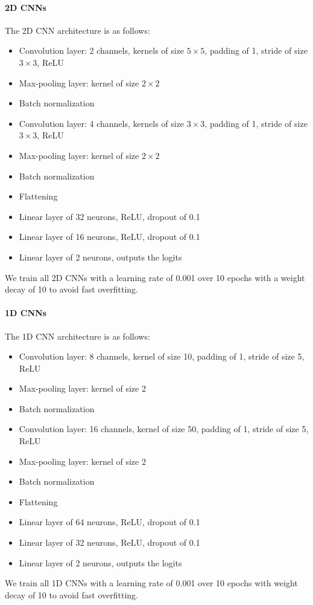 \documentclass[10pt,conference,compsocconf]{IEEEtran}
\begin{document}
\paragraph{2D CNNs}
The 2D CNN architecture is as follows:
\begin{itemize}
  \item Convolution layer: 2 channels, kernels of size \(5\times 5\), padding of 1, stride of size \(3\times 3\), ReLU
  \item Max-pooling layer: kernel of size \(2\times 2\)
  \item Batch normalization
  \item Convolution layer: 4 channels, kernels of size \(3\times 3\), padding of 1, stride of size \(3\times 3\), ReLU
  \item Max-pooling layer: kernel of size \(2\times 2\)
  \item Batch normalization
  \item Flattening
  \item Linear layer of 32 neurons, ReLU, dropout of 0.1
  \item Linear layer of 16 neurons, ReLU, dropout of 0.1
  \item Linear layer of 2 neurons, outputs the logits
\end{itemize}
We train all 2D CNNs with a learning rate of 0.001 over 10 epochs with a weight decay of 10 to avoid fast overfitting.

\paragraph{1D CNNs}
The 1D CNN architecture is as follows:
\begin{itemize}
  \item Convolution layer: 8 channels, kernel of size 10, padding of 1, stride of size 5, ReLU
  \item Max-pooling layer: kernel of size 2
  \item Batch normalization
  \item Convolution layer: 16 channels, kernel of size 50, padding of 1, stride of size 5, ReLU
  \item Max-pooling layer: kernel of size 2
  \item Batch normalization
  \item Flattening
  \item Linear layer of 64 neurons, ReLU, dropout of 0.1
  \item Linear layer of 32 neurons, ReLU, dropout of 0.1
  \item Linear layer of 2 neurons, outputs the logits
\end{itemize}
We train all 1D CNNs with a learning rate of 0.001 over 10 epochs with weight decay of 10 to avoid fast overfitting.

\newpage



\end{document}
